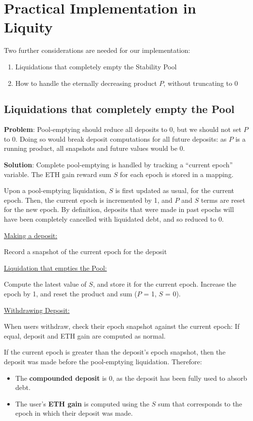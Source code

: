 \documentclass[reqno]{article}
\begin{document}
\section{Practical Implementation in Liquity}
Two further considerations are needed for our implementation:
\begin{enumerate}
    \item Liquidations that completely empty the Stability Pool
    \item How to handle the eternally decreasing product $P$, without truncating to 0
\end{enumerate}

\bigskip
\subsection{Liquidations that completely empty the Pool}

\bigskip
\textbf{Problem}: Pool-emptying should reduce all deposits to 0, but we should not set $P$ to 0. Doing so would break deposit computations for all future deposits: as $P$ is a running product, all snapshots and future values would be 0.

\bigskip
\textbf{Solution}: Complete pool-emptying is handled by tracking a “current epoch” variable. The ETH gain reward sum $S$ for each epoch is stored in a mapping.

\bigskip
Upon a pool-emptying liquidation, $S$ is first updated as usual, for the current epoch. Then, the current epoch is incremented by 1, and $P$ and $S$ terms are reset for the new epoch. By definition, deposits that were made in past epochs will have been completely cancelled with liquidated debt, and so reduced to 0.

\bigskip
\underline{Making a deposit:}

Record a snapshot of the current epoch for the deposit

\bigskip
\underline{Liquidation that empties the Pool:}

Compute the latest value of $S$, and store it for the current epoch.
Increase the epoch by 1, and reset the product and sum ($P$ = 1, $S$ = 0).

\bigskip
\underline{Withdrawing Deposit:}

When users withdraw, check their epoch snapshot against the current epoch: If equal, deposit and ETH gain are computed as normal.

\bigskip
If the current epoch is greater than the deposit’s epoch snapshot, then the deposit was made before the pool-emptying liquidation. Therefore:
\begin{itemize}
    \item The \textbf{compounded deposit} is 0, as the deposit has been fully used to absorb debt.
    \item The user’s \textbf{ETH gain} is computed using the $S$ sum that corresponds to the epoch in which their deposit was made.
\end{itemize}
\end{document}
